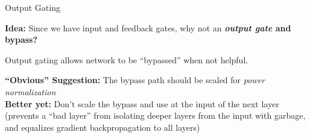 \begin{slide}[\slideopts,toc={Skip Connection}]{Output Gating}

  \vspace{-1em}

  \textbf{Idea:} Since we have input and feedback gates, why not an \textbf{\emph{output gate} and bypass?}


\maybepause
Output gating allows network to be ``bypassed'' when not helpful.

\begin{itemize}
\mpitem \textbf{``Obvious'' Suggestion:} The bypass path should be scaled for \emph{power normalization}\\
\mpitem \textbf{Better yet:} Don't scale the bypass and use  at the input of the next layer\\
(prevents a ``bad layer'' from isolating deeper layers from the input with garbage,\\
and equalizes gradient backpropagation to all layers)
\end{itemize}

\end{slide}


